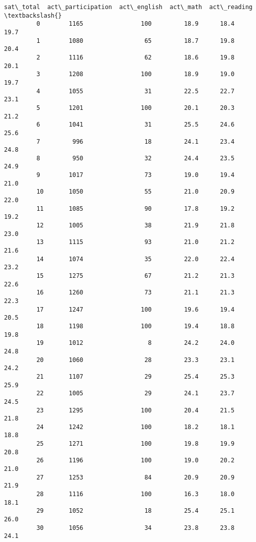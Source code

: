\documentclass[11pt]{article}
\begin{document}
\begin{Verbatim}[commandchars=\\\{\}]
             sat\_total  act\_participation  act\_english  act\_math  act\_reading  \textbackslash{}
         0        1165                100         18.9      18.4         19.7   
         1        1080                 65         18.7      19.8         20.4   
         2        1116                 62         18.6      19.8         20.1   
         3        1208                100         18.9      19.0         19.7   
         4        1055                 31         22.5      22.7         23.1   
         5        1201                100         20.1      20.3         21.2   
         6        1041                 31         25.5      24.6         25.6   
         7         996                 18         24.1      23.4         24.8   
         8         950                 32         24.4      23.5         24.9   
         9        1017                 73         19.0      19.4         21.0   
         10       1050                 55         21.0      20.9         22.0   
         11       1085                 90         17.8      19.2         19.2   
         12       1005                 38         21.9      21.8         23.0   
         13       1115                 93         21.0      21.2         21.6   
         14       1074                 35         22.0      22.4         23.2   
         15       1275                 67         21.2      21.3         22.6   
         16       1260                 73         21.1      21.3         22.3   
         17       1247                100         19.6      19.4         20.5   
         18       1198                100         19.4      18.8         19.8   
         19       1012                  8         24.2      24.0         24.8   
         20       1060                 28         23.3      23.1         24.2   
         21       1107                 29         25.4      25.3         25.9   
         22       1005                 29         24.1      23.7         24.5   
         23       1295                100         20.4      21.5         21.8   
         24       1242                100         18.2      18.1         18.8   
         25       1271                100         19.8      19.9         20.8   
         26       1196                100         19.0      20.2         21.0   
         27       1253                 84         20.9      20.9         21.9   
         28       1116                100         16.3      18.0         18.1   
         29       1052                 18         25.4      25.1         26.0   
         30       1056                 34         23.8      23.8         24.1   

\end{Verbatim}
\end{document}
